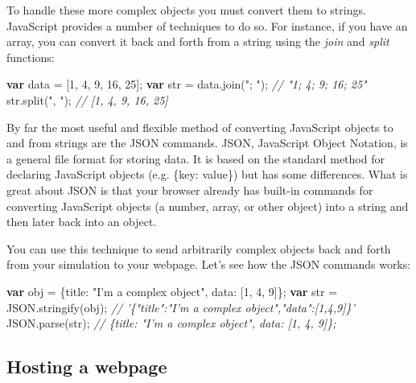 \documentclass[]{memoir}
\newenvironment{Shaded}{}{}
\newcommand{\KeywordTok}[1]{\textcolor[rgb]{0.00,0.44,0.13}{\textbf{{#1}}}}
\newcommand{\DataTypeTok}[1]{\textcolor[rgb]{0.56,0.13,0.00}{{#1}}}
\newcommand{\DecValTok}[1]{\textcolor[rgb]{0.25,0.63,0.44}{{#1}}}
\newcommand{\StringTok}[1]{\textcolor[rgb]{0.25,0.44,0.63}{{#1}}}
\newcommand{\CommentTok}[1]{\textcolor[rgb]{0.38,0.63,0.69}{\textit{{#1}}}}
\newcommand{\OtherTok}[1]{\textcolor[rgb]{0.00,0.44,0.13}{{#1}}}
\newcommand{\FunctionTok}[1]{\textcolor[rgb]{0.02,0.16,0.49}{{#1}}}
\newcommand{\NormalTok}[1]{{#1}}
\begin{document}
To handle these more complex objects you must convert them to strings.
JavaScript provides a number of techniques to do so. For instance, if
you have an array, you can convert it back and forth from a string using
the \emph{join} and \emph{split} functions:

\begin{Shaded}
\begin{Highlighting}[]
\KeywordTok{var} \NormalTok{data = [}\DecValTok{1}\NormalTok{, }\DecValTok{4}\NormalTok{, }\DecValTok{9}\NormalTok{, }\DecValTok{16}\NormalTok{, }\DecValTok{25}\NormalTok{];}
\KeywordTok{var} \NormalTok{str = }\OtherTok{data}\NormalTok{.}\FunctionTok{join}\NormalTok{(}\StringTok{"; "}\NormalTok{); }\CommentTok{// "1; 4; 9; 16; 25"}
\OtherTok{str}\NormalTok{.}\FunctionTok{split}\NormalTok{(}\StringTok{", "}\NormalTok{); }\CommentTok{// [1, 4, 9, 16, 25]}
\end{Highlighting}
\end{Shaded}

By far the most useful and flexible method of converting JavaScript
objects to and from strings are the JSON commands. JSON, JavaScript
Object Notation, is a general file format for storing data. It is based
on the standard method for declaring JavaScript objects (e.g. \{key:
value\}) but has some differences. What is great about JSON is that your
browser already has built-in commands for converting JavaScript objects
(a number, array, or other object) into a string and then later back
into an object.

You can use this technique to send arbitrarily complex objects back and
forth from your simulation to your webpage. Let's see how the JSON
commands works:

\begin{Shaded}
\begin{Highlighting}[]
\KeywordTok{var} \NormalTok{obj = \{}\DataTypeTok{title}\NormalTok{: }\StringTok{"I'm a complex object"}\NormalTok{, }\DataTypeTok{data}\NormalTok{: [}\DecValTok{1}\NormalTok{, }\DecValTok{4}\NormalTok{, }\DecValTok{9}\NormalTok{]\};}
\KeywordTok{var} \NormalTok{str = }\OtherTok{JSON}\NormalTok{.}\FunctionTok{stringify}\NormalTok{(obj); }\CommentTok{// '\{"title":"I'm a complex object","data":[1,4,9]\}'}
\OtherTok{JSON}\NormalTok{.}\FunctionTok{parse}\NormalTok{(str); }\CommentTok{// \{title: "I'm a complex object", data: [1, 4, 9]\};}
\end{Highlighting}
\end{Shaded}

\subsection{Hosting a webpage}
\end{document}

